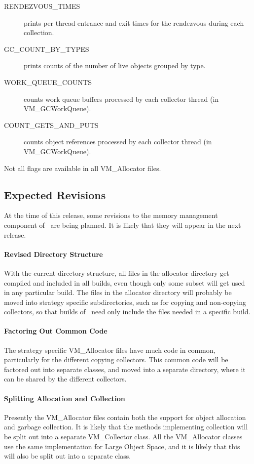 \begin{description}
\item[RENDEZVOUS\_TIMES] prints per thread entrance and exit times for the
rendezvous during each collection.
\item[GC\_COUNT\_BY\_TYPES] prints counts of the number of live objects grouped
by type.
\item[WORK\_QUEUE\_COUNTS] counts work queue buffers processed by each collector
thread (in VM\_GCWorkQueue). 
\item[COUNT\_GETS\_AND\_PUTS] counts object references processed by each collector
thread (in VM\_GCWorkQueue). 
\end{description}
Not all flags are available in all VM\_Allocator files.

\subsection{Expected Revisions} \label{sssec:revisions}
At the time of this release, some revisions to the
memory management component of \jp\
are being planned.  It is likely that they will appear in
the next release.

\paragraph{Revised Directory Structure}
With the current directory structure, all files in the allocator
directory get compiled and included in all builds, even though
only some subset will get used in any particular build.  The 
files in the allocator directory will probably be moved into strategy
specific subdirectories, such as for copying and non-copying 
collectors, so that builds of \jp\ need only include the files
needed in a specific build.

\paragraph{Factoring Out Common Code}
The strategy specific VM\_Allocator files have much code in common,
particularly for the different copying collectors.  This common code
will be factored out into separate classes, and moved into a
separate directory, where it can be shared by the different collectors.

\paragraph{Splitting Allocation and Collection}
Presently the VM\_Allocator files contain both the support for
object allocation and garbage collection.  It is likely that
the methods implementing collection will be split out into
a separate VM\_Collector class.  All the VM\_Allocator classes use
the same implementation for Large Object Space, and it is likely
that this will also be split out into a separate class.

